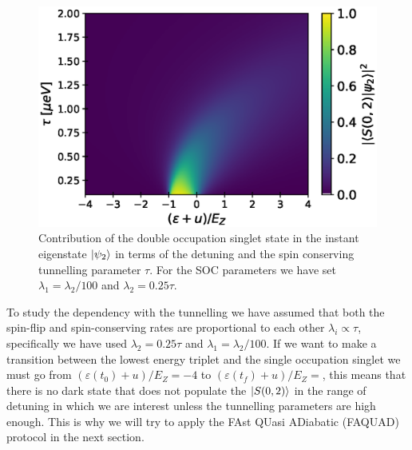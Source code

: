 \documentclass[a4paper,11pt]{article}
\begin{document}
\begin{figure}[!htbp]
	\centering
	\includegraphics[width=0.6\linewidth]{occupation_middle_state.eps}
	\caption{Contribution of the double occupation singlet state in the instant eigenstate $\ket{\psi_2}$ in terms of the detuning and the spin conserving tunnelling parameter $\tau$. For the SOC parameters we have set $\lambda_1=\lambda_2/100$ and $\lambda_2=0.25\tau$.}
	\label{fig:occupation_middle_state}
\end{figure}

To study the dependency with the tunnelling we have assumed that both the spin-flip and spin-conserving rates are proportional to each other $\lambda_i\propto \tau$, specifically we have used $\lambda_2=0.25\tau$ and $\lambda_1=\lambda_2/100$. If we want to make a transition between the lowest energy triplet and the single occupation singlet we must go from $(\varepsilon(t_0)+u)/E_Z=-4$ to $(\varepsilon(t_f)+u)/E_Z=$, this means that there is no dark state that does not populate the $\ket{S(0,2)}$ in the range of detuning in which we are interest unless the tunnelling parameters are high enough. This is why we will try to apply the FAst QUasi ADiabatic (FAQUAD) protocol in the next section.
\end{document}
